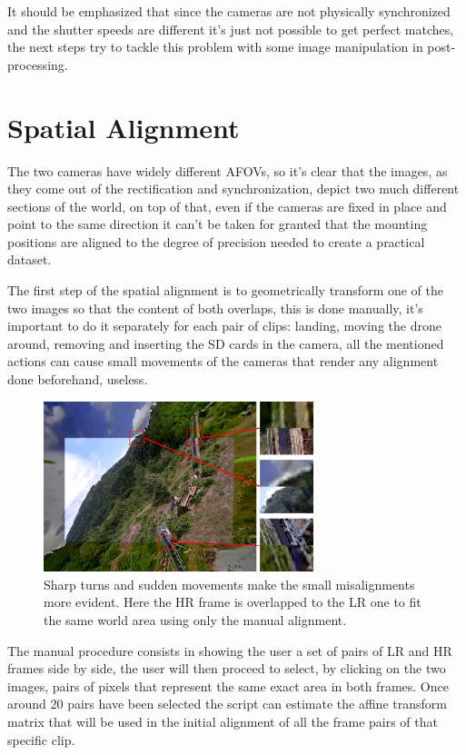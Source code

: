 It should be emphasized that since the cameras are not physically synchronized and the shutter speeds are different it's just not possible to get perfect matches, the next steps try to tackle this problem with some image manipulation in post-processing.

\section{Spatial Alignment}
\label{sec:spatial_align}

The two cameras have widely different AFOVs, so it's clear that the images, as they come out of the rectification and synchronization, depict two much different sections of the world, on top of that, even if the cameras are fixed in place and point to the same direction it can't be taken for granted that the mounting positions are aligned to the degree of precision needed to create a practical dataset.

The first step of the spatial alignment is to geometrically transform one of the two images so that the content of both overlaps, this is done manually, it's important to do it separately for each pair of clips: landing, moving the drone around, removing and inserting the SD cards in the camera, all the mentioned actions can cause small movements of the cameras that render any alignment done beforehand, useless.

\begin{figure}[H]
  \centering
  \includegraphics[width=0.7\textwidth]{figures/HR_on_LR_M_err_highlight.png}
  \caption{Sharp turns and sudden movements make the small misalignments more evident. Here the HR frame is overlapped to the LR one to fit the same world area using only the manual alignment.}
  \label{img:align_err}
\end{figure}

The manual procedure consists in showing the user a set of pairs of LR and HR frames side by side, the user will then proceed to select, by clicking on the two images, pairs of pixels that represent the same exact area in both frames. Once around 20 pairs have been selected the script can estimate the affine transform matrix that will be used in the initial alignment of all the frame pairs of that specific clip.

